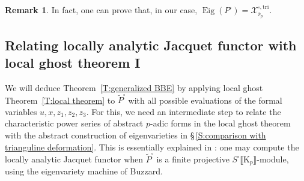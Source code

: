 \documentclass[12pt]{amsart}
\theoremstyle{definition}
\newtheorem{remark}[subsection]{Remark}
\numberwithin{equation}{subsection}
\def\calX{\mathcal{X}}
\def\rmK{\mathrm{K}}
\newcommand{\tri}{\mathrm{tri}}
\DeclareMathOperator{\Eig}{Eig}
\begin{document}
\begin{remark}
In fact, one can prove that, in our case, $\Eig(P^\square) = \calX_{\bar r_p}^{\square, \tri}$.
\end{remark}



\subsection{Relating locally analytic Jacquet functor with local ghost theorem I}
\label{S:comparison Jacquet and local ghost 1}
We will deduce Theorem~\ref{T:generalized BBE} by applying local ghost Theorem~\ref{T:local theorem} to $\widetilde P^{\square}$ with all possible evaluations of the formal variables $u,x,z_1, z_2 , z_3$. For this, we need an intermediate step to relate the characteristic power series of abstract $p$-adic  forms in the local ghost theorem with the abstract construction of eigenvarieties in \S\,\ref{S:comparison with trianguline deformation}.
This is essentially explained in \cite[Proposition~4.2.36]{emerton-Jacquet}: one may compute the locally analytic Jacquet functor when $\widetilde P^\square$ is a finite projective $S^\square\llbracket \rmK_p\rrbracket$-module, using the eigenvariety machine of Buzzard.
\end{document}
